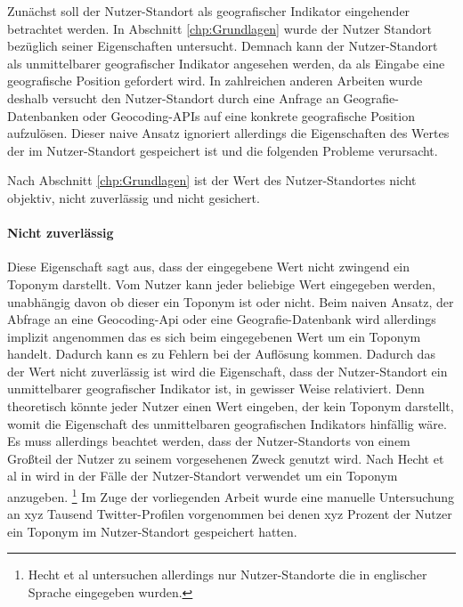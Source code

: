 			Zunächst soll der Nutzer-Standort als geografischer Indikator eingehender betrachtet werden. 
			In Abschnitt \ref{chp:Grundlagen} wurde der Nutzer Standort bezüglich seiner Eigenschaften untersucht. 
			Demnach kann der Nutzer-Standort als unmittelbarer geografischer Indikator angesehen werden, da als Eingabe eine geografische Position gefordert wird.  
			In zahlreichen anderen Arbeiten wurde deshalb versucht den Nutzer-Standort  durch eine Anfrage an Geografie-Datenbanken oder Geocoding-APIs auf eine konkrete geografische Position aufzulösen.
			Dieser naive Ansatz ignoriert allerdings die Eigenschaften des Wertes der im Nutzer-Standort gespeichert ist und die folgenden Probleme verursacht.

			Nach Abschnitt \ref{chp:Grundlagen} ist der Wert des Nutzer-Standortes nicht objektiv, nicht zuverlässig und nicht gesichert. 
			
			\paragraph{Nicht zuverlässig} Diese Eigenschaft sagt aus, dass der eingegebene Wert nicht zwingend ein Toponym darstellt.
			Vom Nutzer kann jeder beliebige Wert eingegeben werden, unabhängig davon ob dieser ein Toponym ist oder nicht.
			Beim naiven Ansatz, der Abfrage an eine Geocoding-Api oder eine Geografie-Datenbank wird allerdings implizit angenommen das es sich beim eingegebenen Wert um ein Toponym handelt.
			Dadurch kann es zu Fehlern bei der Auflösung kommen.
			Dadurch das der Wert nicht zuverlässig ist wird die Eigenschaft, dass der Nutzer-Standort ein unmittelbarer geografischer Indikator ist, in gewisser Weise relativiert.
			Denn theoretisch könnte jeder Nutzer einen Wert eingeben, der kein Toponym darstellt, womit die Eigenschaft des unmittelbaren geografischen Indikators hinfällig wäre.
			Es muss allerdings beachtet werden, dass der Nutzer-Standorts von einem Großteil der Nutzer zu seinem vorgesehenen Zweck genutzt wird.
			Nach Hecht et al in \cite{Hecht2011} wird in  der Fälle der Nutzer-Standort verwendet um ein Toponym anzugeben. \footnote{Hecht et al untersuchen allerdings nur Nutzer-Standorte die in englischer Sprache eingegeben wurden.}
			Im Zuge der vorliegenden Arbeit wurde eine manuelle Untersuchung an xyz Tausend Twitter-Profilen vorgenommen bei denen xyz Prozent der Nutzer ein Toponym im Nutzer-Standort gespeichert hatten.   



